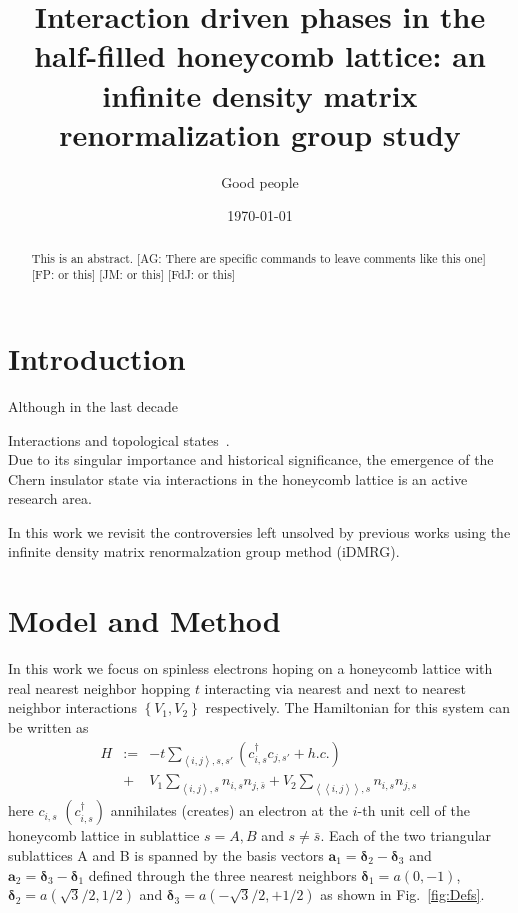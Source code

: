 \documentclass[aps,prx,10pt,twocolumn,floatfix,superscriptaddress,showpacs,numerical,footinbib]{revtex4-1}
\newcommand{\noteAG}[1]{{\color{blue} [AG: #1]}}
\newcommand{\noteFP}[1]{{\color{magenta} [FP: #1]}}
\newcommand{\noteJM}[1]{{\color{red} [JM: #1]}}
\newcommand{\noteFdJ}[1]{{\color{cyan} [FdJ: #1]}}
\newcommand{\bs}[1]{{\boldsymbol{#1}}}
\begin{document}
%
\title{Interaction driven phases in the half-filled honeycomb lattice: an infinite density matrix renormalization group study}
%
\author{Good people}
%
\date{\today}
%
\begin{abstract}
%
This is an abstract.
%
\noteAG{There are specific commands to leave comments like this one}\noteFP{or this}\noteJM{or this}\noteFdJ{or this}
%
\end{abstract}
%
\maketitle
%

\section{Introduction}
%
Although in the last decade

Interactions and topological states~\cite{H88}.\\
%

%
Due to its singular importance and historical significance, 
the emergence of the Chern insulator state via interactions in the honeycomb lattice is an active
research area. 
%


%
In this work we revisit the controversies left unsolved by previous works using the infinite density matrix renormalzation group method (iDMRG). \\


\section{Model and Method}
%
In this work we focus on spinless electrons hoping on a honeycomb lattice with real nearest neighbor hopping $t$ interacting via nearest and next to nearest neighbor interactions 
$\left\lbrace V_{1},V_{2}\right\rbrace$ respectively. 
%
The Hamiltonian for this system can be written as
\begin{eqnarray}
\nonumber
%
H&:=&-t\sum_{\left\langle i,j\right\rangle ,s,s'}(c^{\dagger}_{i,s}c_{j,s'}+h.c.)\\
%
\;&+&
V_{1}\sum_{\left\langle i,j\right\rangle ,s }n_{i,s}n_{j,\bar{s}}+
%
V_{2}\sum_{\left\langle \left\langle i,j\right\rangle \right\rangle ,s }n_{i,s}n_{j,s}\,
%
\label{eq:H}
%
\end{eqnarray}
%
here $c_{i,s}$ $(c^{\dagger}_{i,s})$  annihilates (creates) an electron at the $i$-th unit cell of the honeycomb lattice
in sublattice $s=A,B$ and $s\neq\bar{s}$. 
%
Each of the two triangular sublattices A and B is spanned by the basis vectors
$\bs{a}_{1}=\bs{\delta}_{2}-\bs{\delta}_{3}$ and 
$\bs{a}_{2}=\bs{\delta}_{3}-\bs{\delta}_{1}$ defined through the three nearest neighbors $\bs{\delta}_{1}=a(0,-1)$,  
$\bs{\delta}_{2}=a(\sqrt{3}/2,1/2)$ and $\bs{\delta}_{3}=a(-\sqrt{3}/2,+1/2)$ as shown in Fig.~\ref{fig:Defs}.\\
%
\end{document}

